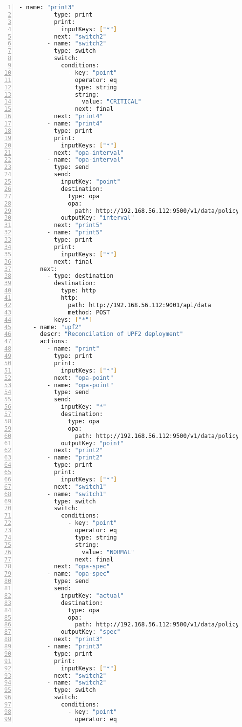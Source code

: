 \begin{lstlisting}[language=sh, caption={\emph{Kod LupN}}, label={lst:a101}, numbers=left, stepnumber=1]
        - name: "print3"
          type: print
          print:
            inputKeys: ["*"]
          next: "switch2"
        - name: "switch2"
          type: switch
          switch:
            conditions:
              - key: "point"
                operator: eq
                type: string
                string: 
                  value: "CRITICAL"
                next: final
          next: "print4"
        - name: "print4"
          type: print
          print:
            inputKeys: ["*"]
          next: "opa-interval"
        - name: "opa-interval"
          type: send
          send: 
            inputKey: "point"
            destination: 
              type: opa
              opa: 
                path: http://192.168.56.112:9500/v1/data/policy/interval
            outputKey: "interval"
          next: "print5"
        - name: "print5"
          type: print
          print:
            inputKeys: ["*"]
          next: final
      next: 
        - type: destination
          destination: 
            type: http
            http: 
              path: http://192.168.56.112:9001/api/data
              method: POST
          keys: ["*"]
    - name: "upf2"
      descr: "Reconcilation of UPF2 deployment"
      actions:
        - name: "print"
          type: print
          print:
            inputKeys: ["*"]
          next: "opa-point"
        - name: "opa-point"
          type: send
          send: 
            inputKey: "*"
            destination: 
              type: opa
              opa: 
                path: http://192.168.56.112:9500/v1/data/policy/point
            outputKey: "point"
          next: "print2"
        - name: "print2"
          type: print
          print:
            inputKeys: ["*"]
          next: "switch1"
        - name: "switch1"
          type: switch
          switch:
            conditions:
              - key: "point"
                operator: eq
                type: string
                string: 
                  value: "NORMAL"
                next: final
          next: "opa-spec"
        - name: "opa-spec"
          type: send
          send: 
            inputKey: "actual"
            destination: 
              type: opa
              opa: 
                path: http://192.168.56.112:9500/v1/data/policy/spec
            outputKey: "spec"
          next: "print3"
        - name: "print3"
          type: print
          print:
            inputKeys: ["*"]
          next: "switch2"
        - name: "switch2"
          type: switch
          switch:
            conditions:
              - key: "point"
                operator: eq

\end{lstlisting}
